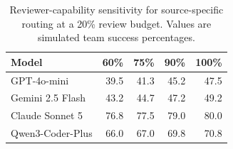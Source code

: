 \begin{table}[t]
\centering
\small
\caption{Reviewer-capability sensitivity for source-specific routing at a 20\% review budget. Values are simulated team success percentages.}
\label{tab:reviewer_sensitivity_final}
\begin{tabular}{lrrrr}
\toprule
Model & 60\% & 75\% & 90\% & 100\% \\
\midrule
GPT-4o-mini & 39.5 & 41.3 & 45.2 & 47.5 \\
Gemini 2.5 Flash & 43.2 & 44.7 & 47.2 & 49.2 \\
Claude Sonnet 5 & 76.8 & 77.5 & 79.0 & 80.0 \\
Qwen3-Coder-Plus & 66.0 & 67.0 & 69.8 & 70.8 \\
\bottomrule
\end{tabular}
\end{table}
